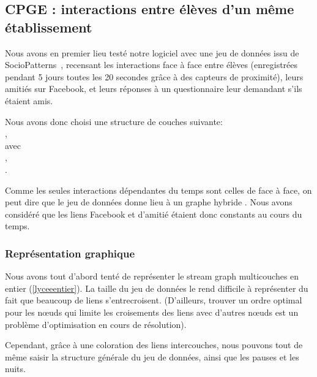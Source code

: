 \documentclass[11pt,a4paper]{article}
\theoremstyle{definition}
\theoremstyle{remark}
\theoremstyle{remark}
\def \stgm {stream graph multicouches}
\begin{document}
\subsection{CPGE : interactions entre élèves d'un même établissement}

    Nous avons en premier lieu testé notre logiciel avec une jeu de données issu de SocioPatterns~\cite{cpge}, recensant les interactions \og face à face\fg{} entre élèves (enregistrées pendant 5 jours toutes les 20 secondes grâce à des capteurs de proximité), leurs amitiés sur Facebook, et leurs réponses à un questionnaire leur demandant s'ils étaient amis.

    Nous avons donc choisi une structure de couches suivante: \\
    \hspace*{2cm}{\tt L=[type de relation,classe,sexe]},\\
     \hspace*{3cm}avec\\
     \hspace*{2cm}{\tt type de relation = [face to face, facebook, contact, amitié]},\\
     \hspace*{2cm}{\tt classe = "MP","MP*1","MP*2","2BIO1","2BIO2","2BIO3","PSI*","PC","PC*"}.
    
    Comme les seules interactions dépendantes du temps sont celles de face à face, on peut dire que le jeu de données donne lieu à un graphe \og hybride \fg{}. Nous avons considéré que les liens Facebook et d'amitié étaient donc constants au cours du temps.
  
	\subsubsection{Représentation graphique}  
  
  Nous avons tout d'abord tenté de représenter le \stgm{} en entier (\cref{lyceeentier}). La taille du jeu de données le rend difficile à représenter du fait que beaucoup de liens s'entrecroisent. (D'ailleurs, trouver un ordre optimal pour les n\oe{}uds qui limite les croisements des liens avec d'autres n\oe{}uds est un problème d'optimisation en cours de résolution).
  
  Cependant, grâce à une coloration des liens intercouches, nous pouvons tout de même saisir la structure générale du jeu de données, ainsi que les pauses et les nuits.
	
\end{document}
